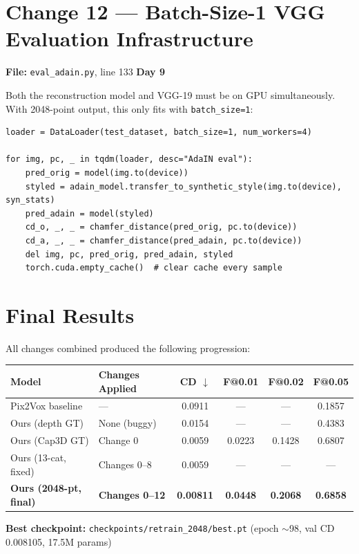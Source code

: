 \documentclass[10pt,a4paper]{article}
\begin{document}
\section*{Change 12 --- Batch-Size-1 VGG Evaluation \hfill \normalfont\small Infrastructure}

\textbf{File:} \texttt{eval\_adain.py}, line 133 \hfill \textbf{Day 9}

Both the reconstruction model and VGG-19 must be on GPU simultaneously. With 2048-point output, this only fits with \texttt{batch\_size=1}:

\begin{lstlisting}
loader = DataLoader(test_dataset, batch_size=1, num_workers=4)

for img, pc, _ in tqdm(loader, desc="AdaIN eval"):
    pred_orig = model(img.to(device))
    styled = adain_model.transfer_to_synthetic_style(img.to(device), syn_stats)
    pred_adain = model(styled)
    cd_o, _, _ = chamfer_distance(pred_orig, pc.to(device))
    cd_a, _, _ = chamfer_distance(pred_adain, pc.to(device))
    del img, pc, pred_orig, pred_adain, styled
    torch.cuda.empty_cache()  # clear cache every sample
\end{lstlisting}

\section*{Final Results}

All changes combined produced the following progression:

\begin{center}
\begin{tabular}{llcccc}
\toprule
\textbf{Model} & \textbf{Changes Applied} & \textbf{CD $\downarrow$} & \textbf{F@0.01} & \textbf{F@0.02} & \textbf{F@0.05} \\
\midrule
Pix2Vox baseline & --- & 0.0911 & --- & --- & 0.1857 \\
Ours (depth GT) & None (buggy) & 0.0154 & --- & --- & 0.4383 \\
Ours (Cap3D GT) & Change 0 & 0.0059 & 0.0223 & 0.1428 & 0.6807 \\
Ours (13-cat, fixed) & Changes 0--8 & 0.0059 & --- & --- & --- \\
\textbf{Ours (2048-pt, final)} & \textbf{Changes 0--12} & \textbf{0.00811} & \textbf{0.0448} & \textbf{0.2068} & \textbf{0.6858} \\
\bottomrule
\end{tabular}
\end{center}

\noindent\textbf{Best checkpoint:} \texttt{checkpoints/retrain\_2048/best.pt} (epoch $\sim$98, val CD 0.008105, 17.5M params)
\end{document}
